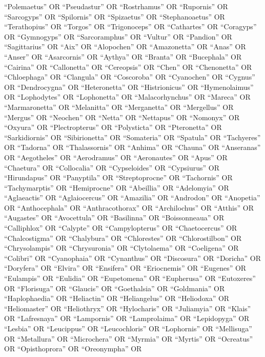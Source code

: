 \documentclass[
  number,
  review,
  onecolumn]{elsarticle}
\begin{document}
``Polemaetus'' OR ``Pseudastur'' OR ``Rostrhamus'' OR ``Rupornis'' OR
``Sarcogyps'' OR ``Spilornis'' OR ``Spizaetus'' OR ``Stephanoaetus'' OR
``Terathopius'' OR ``Torgos'' OR ``Trigonoceps'' OR ``Cathartes'' OR
``Coragyps'' OR ``Gymnogyps'' OR ``Sarcoramphus'' OR ``Vultur'' OR
``Pandion'' OR ``Sagittarius'' OR ``Aix'' OR ``Alopochen'' OR
``Amazonetta'' OR ``Anas'' OR ``Anser'' OR ``Asarcornis'' OR ``Aythya''
OR ``Branta'' OR ``Bucephala'' OR ``Cairina'' OR ``Callonetta'' OR
``Cereopsis'' OR ``Chen'' OR ``Chenonetta'' OR ``Chloephaga'' OR
``Clangula'' OR ``Coscoroba'' OR ``Cyanochen'' OR ``Cygnus'' OR
``Dendrocygna'' OR ``Heteronetta'' OR ``Histrionicus'' OR
``Hymenolaimus'' OR ``Lophodytes'' OR ``Lophonetta'' OR
``Malacorhynchus'' OR ``Mareca'' OR ``Marmaronetta'' OR ``Melanitta'' OR
``Merganetta'' OR ``Mergellus'' OR ``Mergus'' OR ``Neochen'' OR
``Netta'' OR ``Nettapus'' OR ``Nomonyx'' OR ``Oxyura'' OR
``Plectropterus'' OR ``Polysticta'' OR ``Pteronetta'' OR
``Sarkidiornis'' OR ``Sibirionetta'' OR ``Somateria'' OR ``Spatula'' OR
``Tachyeres'' OR ``Tadorna'' OR ``Thalassornis'' OR ``Anhima'' OR
``Chauna'' OR ``Anseranas'' OR ``Aegotheles'' OR ``Aerodramus'' OR
``Aeronautes'' OR ``Apus'' OR ``Chaetura'' OR ``Collocalia'' OR
``Cypseloides'' OR ``Cypsiurus'' OR ``Hirundapus'' OR ``Panyptila'' OR
``Streptoprocne'' OR ``Tachornis'' OR ``Tachymarptis'' OR ``Hemiprocne''
OR ``Abeillia'' OR ``Adelomyia'' OR ``Aglaeactis'' OR ``Aglaiocercus''
OR ``Amazilia'' OR ``Androdon'' OR ``Anopetia'' OR ``Anthocephala'' OR
``Anthracothorax'' OR ``Archilochus'' OR ``Atthis'' OR ``Augastes'' OR
``Avocettula'' OR ``Basilinna'' OR ``Boissonneaua'' OR ``Calliphlox'' OR
``Calypte'' OR ``Campylopterus'' OR ``Chaetocercus'' OR ``Chalcostigma''
OR ``Chalybura'' OR ``Chlorestes'' OR ``Chlorostilbon'' OR
``Chrysolampis'' OR ``Chrysuronia'' OR ``Clytolaema'' OR ``Coeligena''
OR ``Colibri'' OR ``Cyanophaia'' OR ``Cynanthus'' OR ``Discosura'' OR
``Doricha'' OR ``Doryfera'' OR ``Elvira'' OR ``Ensifera'' OR
``Eriocnemis'' OR ``Eugenes'' OR ``Eulampis'' OR ``Eulidia'' OR
``Eupetomena'' OR ``Eupherusa'' OR ``Eutoxeres'' OR ``Florisuga'' OR
``Glaucis'' OR ``Goethalsia'' OR ``Goldmania'' OR ``Haplophaedia'' OR
``Heliactin'' OR ``Heliangelus'' OR ``Heliodoxa'' OR ``Heliomaster'' OR
``Heliothryx'' OR ``Hylocharis'' OR ``Juliamyia'' OR ``Klais'' OR
``Lafresnaya'' OR ``Lampornis'' OR ``Lamprolaima'' OR ``Lepidopyga'' OR
``Lesbia'' OR ``Leucippus'' OR ``Leucochloris'' OR ``Lophornis'' OR
``Mellisuga'' OR ``Metallura'' OR ``Microchera'' OR ``Myrmia'' OR
``Myrtis'' OR ``Ocreatus'' OR ``Opisthoprora'' OR ``Oreonympha'' OR
\end{document}
